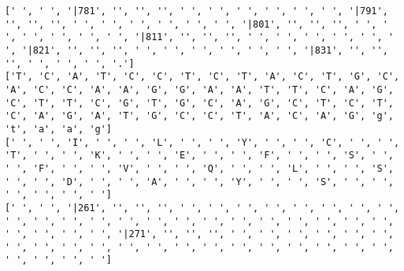 \documentclass{article}
\begin{document}
\begin{Verbatim}
[' ', ' ', '|781', '', '', '', ' ', ' ', ' ', ' ', ' ', ' ', '|791', '', '', '', ' ', ' ', ' ', ' ', ' ', ' ', '|801', '', '', '', ' ', ' ', ' ', ' ', ' ', ' ', '|811', '', '', '', ' ', ' ', ' ', ' ', ' ', ' ', '|821', '', '', '', ' ', ' ', ' ', ' ', ' ', ' ', '|831', '', '', '', ' ', ' ', ' ', '.']
['T', 'C', 'A', 'T', 'C', 'C', 'T', 'C', 'T', 'A', 'C', 'T', 'G', 'C', 'A', 'C', 'C', 'A', 'A', 'G', 'G', 'A', 'A', 'T', 'T', 'C', 'A', 'G', 'C', 'T', 'T', 'C', 'G', 'T', 'G', 'C', 'A', 'G', 'C', 'T', 'C', 'T', 'C', 'A', 'G', 'A', 'T', 'G', 'C', 'C', 'T', 'A', 'C', 'A', 'G', 'g', 't', 'a', 'a', 'g']
[' ', ' ', 'I', ' ', ' ', 'L', ' ', ' ', 'Y', ' ', ' ', 'C', ' ', ' ', 'T', ' ', ' ', 'K', ' ', ' ', 'E', ' ', ' ', 'F', ' ', ' ', 'S', ' ', ' ', 'F', ' ', ' ', 'V', ' ', ' ', 'Q', ' ', ' ', 'L', ' ', ' ', 'S', ' ', ' ', 'D', ' ', ' ', 'A', ' ', ' ', 'Y', ' ', ' ', 'S', ' ', ' ', ' ', ' ', ' ', ' ']
[' ', ' ', '|261', '', '', '', ' ', ' ', ' ', ' ', ' ', ' ', ' ', ' ', ' ', ' ', ' ', ' ', ' ', ' ', ' ', ' ', ' ', ' ', ' ', ' ', ' ', ' ', ' ', ' ', ' ', ' ', '|271', '', '', '', ' ', ' ', ' ', ' ', ' ', ' ', ' ', ' ', ' ', ' ', ' ', ' ', ' ', ' ', ' ', ' ', ' ', ' ', ' ', ' ', ' ', ' ', ' ', ' ']
  

\end{Verbatim}
\end{document}
